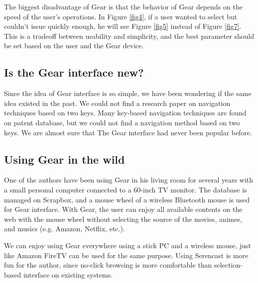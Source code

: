 \documentclass[conference]{IEEEtran}
\def\down{\tsf{▼}}
\def\SC{Serencast}
\def\SB{Scrapbox}
\begin{document}
The biggest disadvantage of Gear is that
the behavior of Gear depends on the speed of the user's operations.
In Figure \ref{fig4},
if a user wanted to select  but couldn't issue {\down}
quickly enough, he will see Figure \ref{fig5} instead of Figure \ref{fig7}.
This is a tradeoff between usability and simplicity, and
the best parameter should be set based on the user and the Gear device.

\subsection{Is the Gear interface new?}

Since the idea of Gear interface is so simple,
we have been wondering if the same idea existed in the past.
%
We could not find a research paper on 
navigation techniques based on two keys.
Many key-based navigation techniques are found on patent database,
but we could not find a navigation method based on two keys.
We are almost sure that The Gear interface had never been popular before.

\subsection{Using Gear in the wild}

One of the authors have been using Gear in his living room for several years
with a small personal computer connected to a 60-inch TV monitor.
The database is managed on {\SB}, and
a mouse wheel of a wireless Bluetooth mouse is used for Gear interface.
With Gear, the user can enjoy all available contents on the web with the mouse wheel
without selecting the source of the movies, animes, and musics (e.g. Amazon, Netflix, etc.).

We can enjoy using Gear everywhere using a stick PC and a wireless mouse,
just like Amazon FireTV can be used for the same purpose.
Using {\SC} is more fun for the author, since no-click browsing is more comfortable than
selection-based interface on existing systems.

\end{document}
